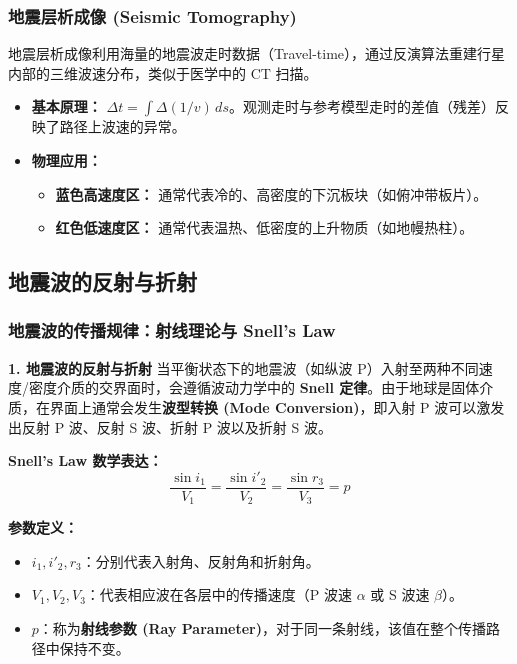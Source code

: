 \documentclass[12pt,a4paper]{article}
\begin{document}
	\subsubsection{地震层析成像 (Seismic Tomography)}
	地震层析成像利用海量的地震波走时数据（Travel-time），通过反演算法重建行星内部的三维波速分布，类似于医学中的 CT 扫描。
	
	\begin{itemize}
		\item \textbf{基本原理：} $\Delta t = \int \Delta (1/v) \, ds$。观测走时与参考模型走时的差值（残差）反映了路径上波速的异常。
		\item \textbf{物理应用：} 
		\begin{itemize}
			\item \textbf{蓝色高速度区：} 通常代表冷的、高密度的下沉板块（如俯冲带板片）。
			\item \textbf{红色低速度区：} 通常代表温热、低密度的上升物质（如地幔热柱）。
		\end{itemize}
	\end{itemize}
	\subsection{地震波的反射与折射}
	\subsubsection{地震波的传播规律：射线理论与 Snell's Law}
	
	\textbf{1. 地震波的反射与折射}
	当平衡状态下的地震波（如纵波 P）入射至两种不同速度/密度介质的交界面时，会遵循波动力学中的 \textbf{Snell 定律}。由于地球是固体介质，在界面上通常会发生\textbf{波型转换 (Mode Conversion)}，即入射 P 波可以激发出反射 P 波、反射 S 波、折射 P 波以及折射 S 波。
	
	\textbf{Snell's Law 数学表达：}
	\begin{equation}
		\frac{\sin i_1}{V_1} = \frac{\sin i'_2}{V_2} = \frac{\sin r_3}{V_3} = p
	\end{equation}
	
	\noindent \textbf{参数定义：}
	\begin{itemize}
		\item $i_1, i'_2, r_3$：分别代表入射角、反射角和折射角。
		\item $V_1, V_2, V_3$：代表相应波在各层中的传播速度（P 波速 $\alpha$ 或 S 波速 $\beta$）。
		\item $p$：称为\textbf{射线参数 (Ray Parameter)}，对于同一条射线，该值在整个传播路径中保持不变。
	\end{itemize}
	
\end{document}
